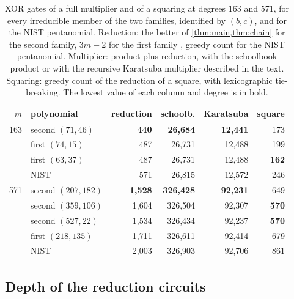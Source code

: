 \documentclass{ieeeaccess}
\theoremstyle{plain}
\theoremstyle{definition}
\begin{document}
\begin{table}[t]
\centering\small
\caption{XOR gates of a full multiplier and of a squaring at degrees $163$ and
$571$, for every irreducible member of the two families, identified by $(b,c)$,
and for the NIST pentanomial. Reduction: the better of \cref{thm:main,thm:chain}
for the second family, $3m-2$ for the first family \cite{BCP2019}, greedy count
for the NIST pentanomial. Multiplier: product plus reduction, with the
schoolbook product or with the recursive Karatsuba multiplier described in the
text. Squaring: greedy count of the reduction of a square, with lexicographic
tie-breaking. The lowest value of each column and degree is in bold.}
\label{tab:mult}
\setlength{\tabcolsep}{2.5pt}
\begin{tabular}{@{}r l r r r r@{}}
\toprule
$m$ & polynomial & reduction & schoolb. & Karatsuba & square\\
\midrule
163 & second $(71,46)$ & \textbf{440} & \textbf{26,684} & \textbf{12,441} & 173\\
    & first $(74,15)$  & 487 & 26,731 & 12,488 & 199\\
    & first $(63,37)$  & 487 & 26,731 & 12,488 & \textbf{162}\\
    & NIST             & 571 & 26,815 & 12,572 & 246\\
\midrule
571 & second $(207,182)$ & \textbf{1,528} & \textbf{326,428} & \textbf{92,231} & 649\\
    & second $(359,106)$ & 1,604 & 326,504 & 92,307 & \textbf{570}\\
    & second $(527,22)$  & 1,534 & 326,434 & 92,237 & \textbf{570}\\
    & first $(218,135)$  & 1,711 & 326,611 & 92,414 & 679\\
    & NIST               & 2,003 & 326,903 & 92,706 & 861\\
\bottomrule
\end{tabular}
\end{table}

\subsection{Depth of the reduction circuits}\label{sec:depth}
\end{document}
